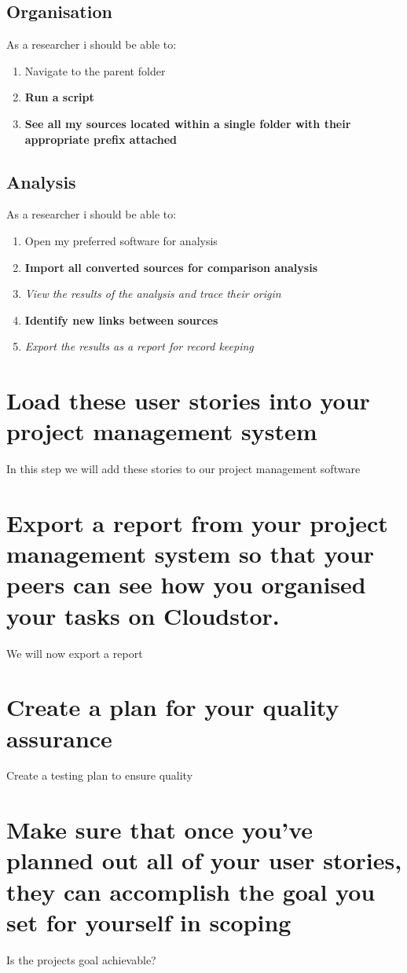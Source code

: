 \documentclass{article}
\begin{document}
\subsection{Organisation}
As a researcher i should be able to:
\begin{enumerate}
    \item Navigate to the parent folder
    \item\textbf{Run a script}
    \item\textbf{See all my sources located within a single folder with their appropriate prefix attached}
\end{enumerate}

\subsection{Analysis}
As a researcher i should be able to:
\begin{enumerate}
    \item Open my preferred software for analysis
    \item\textbf{Import all converted sources for comparison analysis}
    \item\textit{View the results of the analysis and trace their origin}
    \item\textbf{Identify new links between sources}
    \item\textit{Export the results as a report for record keeping}
\end{enumerate}

\section{Load these user stories into your project management system}
In this step we will add these stories to our project management software
\section{Export a report from your project management system so that your peers can see how you organised your tasks on Cloudstor.}
We will now export a report
\section{Create a plan for your quality assurance}
Create a testing plan to ensure quality
\section{Make sure that once you’ve planned out all of your user stories, they can accomplish the goal you set for yourself in scoping}
Is the projects goal achievable?
\end{document}

